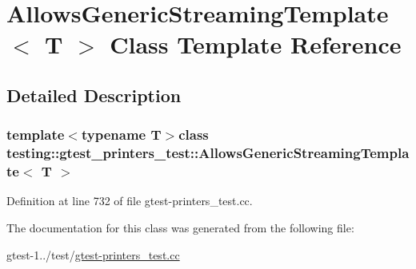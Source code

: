 \hypertarget{classtesting_1_1gtest__printers__test_1_1AllowsGenericStreamingTemplate}{\section{\-Allows\-Generic\-Streaming\-Template$<$ \-T $>$ \-Class \-Template \-Reference}
\label{d6/d18/classtesting_1_1gtest__printers__test_1_1AllowsGenericStreamingTemplate}
}


\subsection{\-Detailed \-Description}
\subsubsection*{template$<$typename T$>$class testing\-::gtest\-\_\-printers\-\_\-test\-::\-Allows\-Generic\-Streaming\-Template$<$ T $>$}



\-Definition at line 732 of file gtest-\/printers\-\_\-test.\-cc.



\-The documentation for this class was generated from the following file\-:\begin{DoxyCompactItemize}
\item 
gtest-\/1../test/\hyperlink{gtest-printers__test_8cc}{gtest-\/printers\-\_\-test.\-cc}\end{DoxyCompactItemize}
